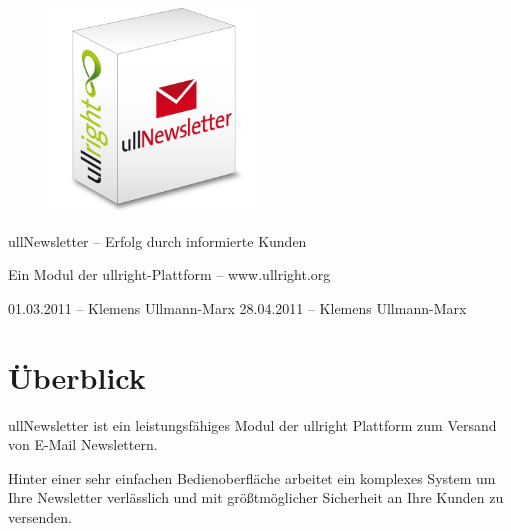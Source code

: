 \documentclass[article, a4paper, oneside, 11pt]{memoir}
\begin{document}
\vspace*{3cm}
\begin{figure}[htp]
\centering
\includegraphics[width=0.5\textwidth]{softwarebox}
\end{figure}

\vspace{3cm}

{%
\huge
\color{ullblue}
ullNewsletter -- Erfolg durch informierte Kunden
}

\vspace{0.2cm}

{%
\large
Ein Modul der ullright-Plattform -- www.ullright.org
}

\vspace{1cm}

{%
\footnotesize
01.03.2011 -- Klemens Ullmann-Marx
28.04.2011 -- Klemens Ullmann-Marx
}

\clearpage

\pagestyle{plain}


\setcounter{secnumdepth}{2}
\setcounter{tocdepth}{2}
\tableofcontents*

\clearpage

\chapter{Überblick}

ullNewsletter ist ein leistungsfähiges Modul der ullright Plattform zum Versand von E-Mail Newslettern.

Hinter einer sehr einfachen Bedienoberfläche arbeitet ein komplexes System um Ihre Newsletter verlässlich und mit größtmöglicher Sicherheit an Ihre Kunden zu versenden.
\end{document}
